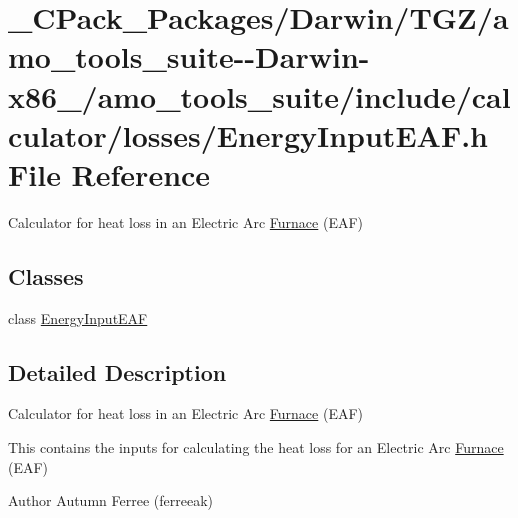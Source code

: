\hypertarget{___c_pack___packages_2_darwin_2_t_g_z_2amo__tools__suite--_darwin-x86__64_2amo__tools__suite_2in02bd3a281dd0d370484fbb9e4f9c9b85}{}\section{\+\_\+\+C\+Pack\+\_\+\+Packages/\+Darwin/\+T\+G\+Z/amo\+\_\+tools\+\_\+suite-\/-\/\+Darwin-\/x86\+\_/amo\+\_\+tools\+\_\+suite/include/calculator/losses/\+Energy\+Input\+E\+AF.h File Reference}
\label{___c_pack___packages_2_darwin_2_t_g_z_2amo__tools__suite--_darwin-x86__64_2amo__tools__suite_2in02bd3a281dd0d370484fbb9e4f9c9b85}


Calculator for heat loss in an Electric Arc \hyperlink{class_furnace}{Furnace} (E\+AF)  


\subsection*{Classes}
\begin{DoxyCompactItemize}
\item 
class \hyperlink{class_energy_input_e_a_f}{Energy\+Input\+E\+AF}
\end{DoxyCompactItemize}


\subsection{Detailed Description}
Calculator for heat loss in an Electric Arc \hyperlink{class_furnace}{Furnace} (E\+AF) 

This contains the inputs for calculating the heat loss for an Electric Arc \hyperlink{class_furnace}{Furnace} (E\+AF)

\begin{DoxyAuthor}{Author}
Autumn Ferree (ferreeak) 
\end{DoxyAuthor}
